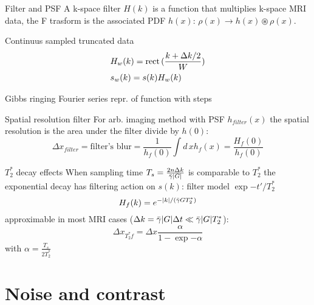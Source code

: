 \begin{frame}{Filter and PSF}
A k-space filter $H(k)$ is a function that multiplies k-space MRI data, the F trasform is the associated PDF $h(x)$: $\rho(x)\to h(x)\circledast \rho(x)$.
\begin{block}{Continuus sampled truncated data}
\begin{align*}
&H_w(k)=\operatorname{rect}{(\frac{k+\Delta k/2}{W})}\\
&s_w(k)=s(k)H_w(k)
\end{align*}
\end{block}
\begin{block}{Gibbs ringing}
Fourier series repr. of function with steps
\end{block}
\begin{block}{Spatial resolution filter}
For arb. imaging method with PSF $h_{filter}(x)$ the spatial resolution is the area under the filter divide by $h(0)$:
\begin{equation*}
\Delta x_{filter}=\text{filter's blur}=\frac{1}{h_f(0)}\int d\,xh_f(x)=\frac{H_f(0)}{h_f(0)}
\end{equation*}
\end{block}
\end{frame}

\begin{frame}{$T_2^*$ decay effects}
When sampling time $T_s=\frac{2n\Delta k}{\gammabar|G|}$ is comparable to $T_2^*$ the exponential decay has filtering action on $s(k)$: filter model $\exp{-t'/T_2^*}$
\begin{equation*}
H_f(k)=\exp{-|k|/(\gammabar GT_2^*)}
\end{equation*}
approximable in most MRI cases ($\Delta k=\gammabar|G|\Delta t\ll\gammabar|G|T_2^*$):
\begin{equation*}
\Delta x_{T_2^*f}=\Delta x\frac{\alpha}{1-\exp{-\alpha}}
\end{equation*}
with $\alpha=\frac{T_s}{2T_2^*}$
\end{frame}

\section{Noise and contrast}

